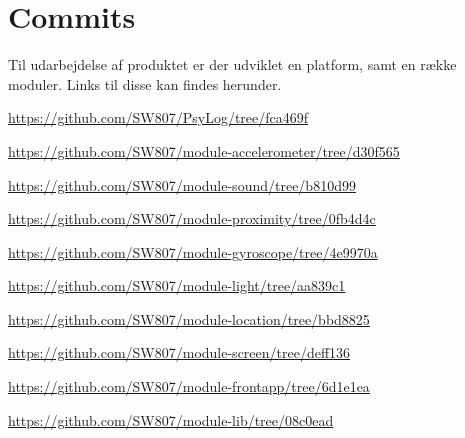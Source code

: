 \chapter{Commits}
Til udarbejdelse af produktet er der udviklet en platform, samt en række moduler.
Links til disse kan findes herunder.

\begin{description}[style=nextline]
	\item[PsyLog] \url{https://github.com/SW807/PsyLog/tree/fca469f}
	\item[module-accelerometer] \url{https://github.com/SW807/module-accelerometer/tree/d30f565}
	\item[module-sound] \url{https://github.com/SW807/module-sound/tree/b810d99}
	\item[module-proximity] \url{https://github.com/SW807/module-proximity/tree/0fb4d4c}
	\item[module-gyroscope] \url{https://github.com/SW807/module-gyroscope/tree/4e9970a}
	\item[module-light] \url{https://github.com/SW807/module-light/tree/aa839c1}
	\item[module-location] \url{https://github.com/SW807/module-location/tree/bbd8825}
	\item[module-screen] \url{https://github.com/SW807/module-screen/tree/deff136}
	\item[module-frontapp] \url{https://github.com/SW807/module-frontapp/tree/6d1e1ea}
	\item[module-lib] \url{https://github.com/SW807/module-lib/tree/08c0ead}
\end{description}
